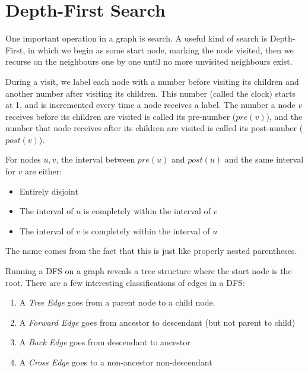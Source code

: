 \chapter{Depth-First Search}

One important operation in a graph is search.  A useful kind of search
is Depth-First, in which we begin as some start node, marking the node
visited, then we recurse on the neighbours one by one until no more
unvisited neighbours exist.

During a visit, we label each node with a number before visiting its
children and another number after visiting its children.  This number
(called the clock) starts at 1, and is incremented every time a node
receives a label.  The number a node $v$ receives before its children
are visited is called its pre-number ($pre(v)$), and the number that
node receives after its children are visited is called its post-number
($post(v)$).

\begin{theorem}

For nodes $u,v$, the interval between $pre(u)$ and $post(u)$ and the
same interval for $v$ are either:

\begin{itemize}

\item Entirely disjoint
\item The interval of $u$ is completely within the interval of $v$
\item The interval of $v$ is completely within the interval of $u$

\end{itemize}

The name comes from the fact that this is just like properly nested
parentheses.

\end{theorem}

Running a DFS on a graph reveals a tree structure where the start node
is the root.  There are a few interesting classifications of edges in
a DFS:

\begin{enumerate}

\item A \emph{Tree Edge} goes from a parent node to a child node.

\item A \emph{Forward Edge} goes from ancestor to descendant (but not
  parent to child)

\item A \emph{Back Edge} goes from descendant to ancestor

\item A \emph{Cross Edge} goes to a non-ancestor non-descendant

\end{enumerate}

